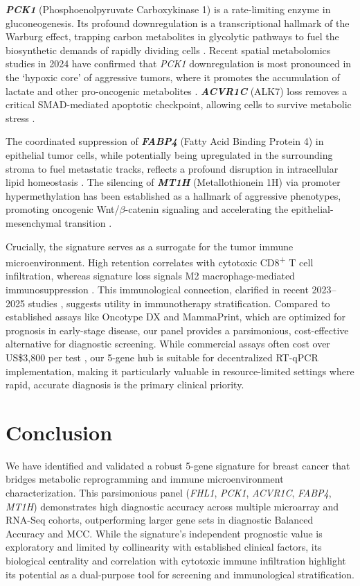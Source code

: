 \documentclass[a4paper,fleqn]{cas-dc}
\newcommand{\gene}[1]{\textit{#1}}
\begin{document}
\textbf{\gene{PCK1}} (Phosphoenolpyruvate Carboxykinase 1) is a rate-limiting enzyme in gluconeogenesis. Its profound downregulation is a transcriptional hallmark of the Warburg effect, trapping carbon metabolites in glycolytic pathways to fuel the biosynthetic demands of rapidly dividing cells \citep{ma2013}. Recent spatial metabolomics studies in 2024 have confirmed that \gene{PCK1} downregulation is most pronounced in the `hypoxic core' of aggressive tumors, where it promotes the accumulation of lactate and other pro-oncogenic metabolites \citep{zhang2024a,fang2024,abate2023}. \textbf{\gene{ACVR1C}} (ALK7) loss removes a critical SMAD-mediated apoptotic checkpoint, allowing cells to survive metabolic stress \citep{zeng2012}.

The coordinated suppression of \textbf{\gene{FABP4}} (Fatty Acid Binding Protein 4) in epithelial tumor cells, while potentially being upregulated in the surrounding stroma to fuel metastatic tracks, reflects a profound disruption in intracellular lipid homeostasis \citep{zeng2020,wang2023_fabp4}. The silencing of \textbf{\gene{MT1H}} (Metallothionein 1H) via promoter hypermethylation has been established as a hallmark of aggressive phenotypes, promoting oncogenic Wnt/$\beta$-catenin signaling and accelerating the epithelial-mesenchymal transition \citep{gu2024_mt1h,wang2024b_mt1h}.

Crucially, the signature serves as a surrogate for the tumor immune microenvironment. High retention correlates with cytotoxic CD8\textsuperscript{+} T cell infiltration, whereas signature loss signals M2 macrophage-mediated immunosuppression \citep{denkert2018}. This immunological connection, clarified in recent 2023--2025 studies \citep{xia2024,lin2025,liu2025,wu2026,tang2025}, suggests utility in immunotherapy stratification. Compared to established assays like Oncotype DX and MammaPrint, which are optimized for prognosis in early-stage disease, our panel provides a parsimonious, cost-effective alternative for diagnostic screening. While commercial assays often cost over US\$3,800 per test \citep{cms2024}, our 5-gene hub is suitable for decentralized RT-qPCR implementation, making it particularly valuable in resource-limited settings where rapid, accurate diagnosis is the primary clinical priority.

\section{Conclusion}\label{sec:conclusion}
We have identified and validated a robust 5-gene signature for breast cancer that bridges metabolic reprogramming and immune microenvironment characterization. This parsimonious panel (\gene{FHL1}, \gene{PCK1}, \gene{ACVR1C}, \gene{FABP4}, \gene{MT1H}) demonstrates high diagnostic accuracy across multiple microarray and RNA-Seq cohorts, outperforming larger gene sets in diagnostic Balanced Accuracy and MCC. While the signature's independent prognostic value is exploratory and limited by collinearity with established clinical factors, its biological centrality and correlation with cytotoxic immune infiltration highlight its potential as a dual-purpose tool for screening and immunological stratification. 
\end{document}
